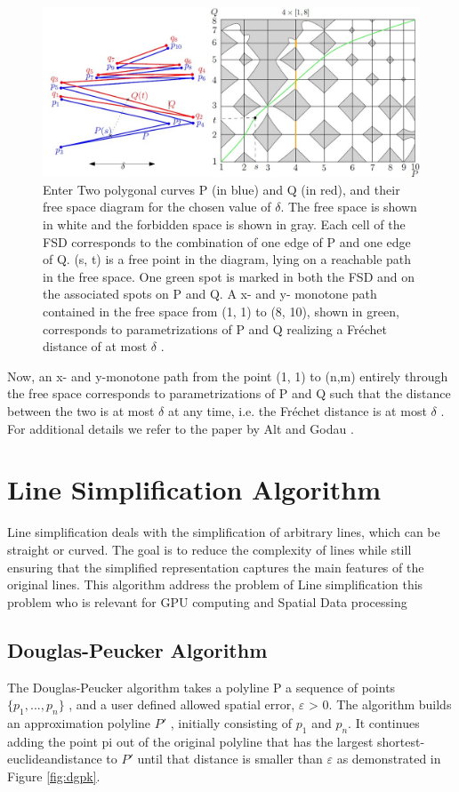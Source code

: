 \documentclass[twoside,12pt, a4paper]{report}
\begin{document}
\begin{figure}[!h]
\centering
\includegraphics[width=1.0\linewidth]{figures/Figure.jpg}
\caption{Enter Two polygonal curves P (in blue) and Q (in red), and their free space
diagram for the chosen value of  $ \delta $. The free space is shown in white and the forbidden
space is shown in gray. Each cell of the FSD corresponds to the combination of
one edge of P and one edge of Q. (s, t) is a free point in the diagram, lying on a
reachable path in the free space. One green spot is marked in both the FSD and on
the associated spots on P and Q. A x- and y- monotone path contained in the free
space from (1, 1) to (8, 10), shown in green, corresponds to parametrizations of P and
Q realizing a Fréchet distance of at most  $ \delta $ \cite{kerkhof2022algorithmic}.}
\label{fig:fsd}
\end{figure}
\vspace{1cm}
Now, an x- and y-monotone path from the point (1, 1) to (n,m) entirely through
the free space corresponds to parametrizations of P and Q such that the distance
between the two is at most $ \delta $  at any time, i.e. the Fréchet distance is at most $ \delta $ .
For additional details we refer to the paper by Alt and Godau \cite{AltGodau}.

\section{Line Simplification Algorithm}
Line simplification deals with the simplification of arbitrary lines, which can be straight or curved. The goal is to reduce the complexity of lines while still ensuring that the simplified representation captures the main features of the original lines. This algorithm address the problem of Line simplification this problem who is relevant for GPU computing and Spatial Data processing

\subsection{Douglas-Peucker Algorithm}
The Douglas-Peucker algorithm  \cite{douglas1973algorithms} \cite{hershberger1994n} takes a polyline
P a sequence of points $\{p_{1},..., p_{n}\}$ , and a user defined
allowed spatial error, $\varepsilon$ > 0. The algorithm builds an
approximation polyline $P'$ , initially consisting of $p_{1}$ and
$p_{n}$. It continues adding the point pi out of the original
polyline that has the largest shortest-euclideandistance
to $P'$ until that distance is smaller than $\varepsilon$ as
demonstrated in Figure \ref{fig:dgpk}.
\end{document}
